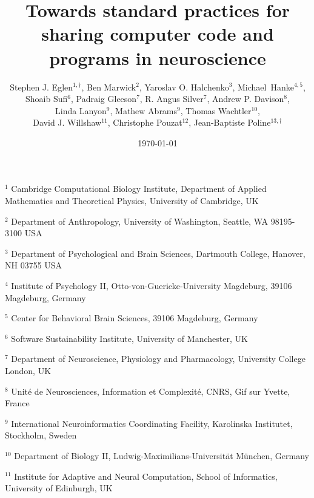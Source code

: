 \documentclass[11pt]{article}
\begin{document}
\onehalfspacing

\title{Towards standard practices for sharing computer code and programs in neuroscience}

\author{Stephen J. Eglen$^{1,\dagger}$, Ben Marwick${^2}$, Yaroslav
  O. Halchenko${^3}$, Michael~Hanke${^{4,5}}$,
  \\
  Shoaib Sufi$^6$,
  Padraig Gleeson$^7$, R. Angus Silver$^7$,
  Andrew P. Davison$^8$,
  \\
  Linda Lanyon$^9$,
  Mathew Abrams$^9$,
  Thomas Wachtler$^{10}$,
  \\
  David J. Willshaw$^{11}$,
  Christophe Pouzat$^{12}$,
  Jean-Baptiste Poline$^{13,\dagger}$}
\date{\today}
\maketitle

\noindent $^{1}$ 
Cambridge Computational Biology Institute,
Department of Applied Mathematics and Theoretical Physics,
University of Cambridge, UK

\noindent $^{2}$ 
Department of Anthropology,
University of Washington,
Seattle, WA 98195-3100 USA 

\noindent $^{3}$
Department of Psychological and Brain Sciences,
Dartmouth College,
Hanover, NH 03755 USA

\noindent $^{4}$
Institute of Psychology II, Otto-von-Guericke-University Magdeburg, 39106 Magdeburg, Germany

\noindent $^{5}$
Center for Behavioral Brain Sciences, 39106 Magdeburg, Germany

\noindent $^{6}$
Software Sustainability Institute, University of Manchester, UK

\noindent $^{7}$
Department of Neuroscience, Physiology and Pharmacology, 
University College London, UK


\noindent $^{8}$
Unit\'{e} de Neurosciences, Information et Complexit\'{e}, CNRS, Gif sur Yvette, France


\noindent $^{9}$
International Neuroinformatics Coordinating Facility, 
Karolinska Institutet, Stockholm, Sweden

\noindent $^{10}$
Department of Biology II, Ludwig-Maximilians-Universit\"{a}t
M\"{u}nchen, Germany

\noindent $^{11}$
Institute for Adaptive and Neural Computation, 
School of Informatics, University of Edinburgh, UK
\end{document}
